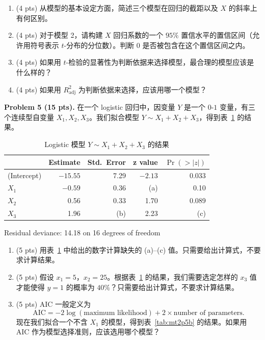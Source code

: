\documentclass[11pt]{ctexart}
\begin{document}
\begin{enumerate}
\item (4 pts) 从模型的基本设定方面，简述三个模型在回归的截距以及 $X$ 的斜率上有何区别。
\item (4 pts) 对于模型 2，请构建 $X$ 回归系数的一个 $95\%$ 置信水平的置信区间（允许用符号表示 $t$-分布的分位数）。判断 $0$ 是否被包含在这个置信区间之内。
\item (4 pts) 如果用 $t$-检验的显著性为判断依据来选择模型，最合理的模型应该是什么样的？
\item (4 pts) 如果用 $R^2_{\mathrm{adj}}$ 为判断依据来选择，应该用哪一个模型？
\end{enumerate}

\noindent\textbf{Problem 5 (15 pts).} 在一个 logistic 回归中，因变量 $Y$ 是一个 $0$-$1$ 变量，有三个连续型自变量 $X_1, X_2, X_3$。我们拟合模型 $Y \sim X_1 + X_2 + X_3$，得到表~\ref{tab:mt2p5} 的结果。

\begin{table}[h]
\centering
\caption{Logistic 模型 $Y \sim X_1 + X_2 + X_3$ 的结果}
\label{tab:mt2p5}
\begin{tabular}{lrrrr}
\toprule
 & Estimate & Std.\ Error & z value & $\Pr(>|z|)$ \\
\midrule
(Intercept) & $-15.55$ & 7.29 & $-2.13$ & 0.033 \\
$X_1$ & $-0.59$ & 0.36 & (a) & 0.10 \\
$X_2$ & 0.56 & 0.33 & 1.70 & 0.089 \\
$X_3$ & 1.96 & (b) & 2.23 & (c) \\
\bottomrule
\end{tabular}

\vspace{0.3em}
\centering Residual deviance: 14.18 on 16 degrees of freedom
\end{table}

\begin{enumerate}
\item (5 pts) 用表~\ref{tab:mt2p5} 中给出的数字计算缺失的 (a)--(c) 值。只需要给出计算式，不要求计算结果。
\item (5 pts) 假设 $x_1 = 5$，$x_2 = 25$。根据表~\ref{tab:mt2p5} 的结果，我们需要选定怎样的 $x_3$ 值才能使得 $y = 1$ 的概率为 $40\%$？只需要给出计算式，不要求计算结果。
\item (5 pts) AIC 一般定义为
\[
\mathrm{AIC} = -2\log(\text{maximum likelihood}) + 2 \times \text{number of parameters}.
\]
现在我们拟合一个不含 $X_1$ 的模型，得到表~\ref{tab:mt2p5b} 的结果。如果用 AIC 作为模型选择准则，应该选用哪个模型？
\end{enumerate}
\end{document}
